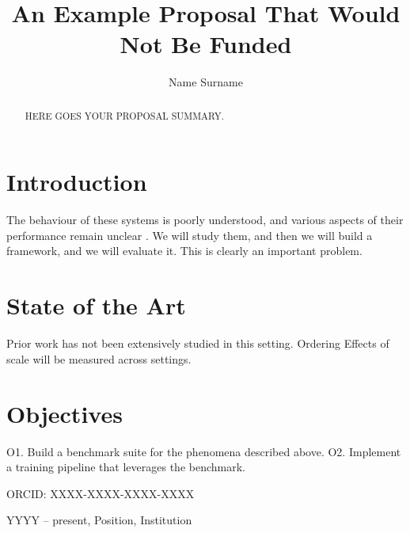\documentclass[11pt,a4paper]{article}
\title{An Example Proposal That Would Not Be Funded}
\author[Surname]{Name Surname}
\begin{document}
\maketitle

\begin{abstract}
HERE GOES YOUR PROPOSAL SUMMARY.
\end{abstract}

\startsectiona

\section{Introduction}
The behaviour of these systems is poorly understood, and various aspects of their
performance remain unclear \citep{}. We will study them, and then we will build a
framework, and we will evaluate it. This is clearly an important problem.

\section{State of the Art}
Prior work has not been extensively studied in this setting.
Ordering
Effects of scale will be measured across settings.

\section{Objectives}
O1. Build a benchmark suite for the phenomena described above.
O2. Implement a training pipeline that leverages the benchmark.

\startsectionb

ORCID: XXXX-XXXX-XXXX-XXXX

YYYY -- present, Position, Institution
\end{document}

